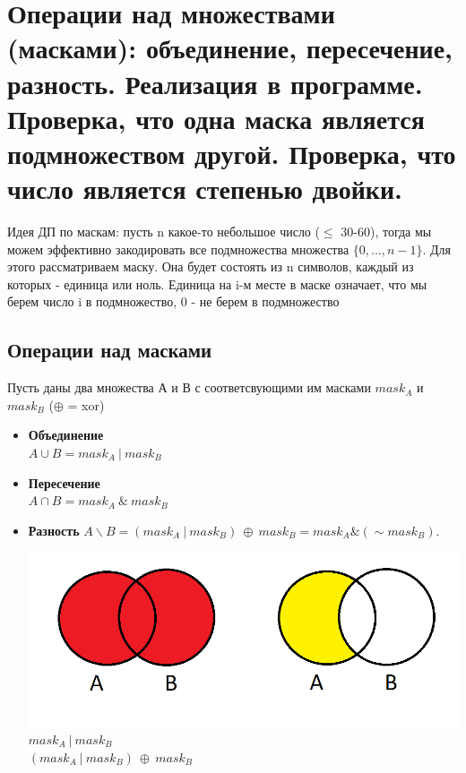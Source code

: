 \setcounter{section}{17}
\section{Операции над множествами (масками): объединение, пересечение, разность. Реализация в программе. Проверка, что одна маска является подмножеством другой. Проверка, что число является
степенью двойки.}
Идея ДП по маскам: пусть n какое-то небольшое число ($\leq$ 30-60), тогда мы можем эффективно закодировать все подмножества множества $\{0,...,n-1\}$. Для этого рассматриваем маску. Она будет состоять из n символов, каждый из которых - единица или ноль. Единица на i-м месте в маске означает, что мы берем число i в подмножество, 0 - не берем в подмножество
\subsection*{Операции над масками}
Пусть даны два множества А и В с соответсвующими им масками $mask_A$ и $mask_B$ ($\oplus$ = xor)
\begin{itemize}
    \item []\textbf{Объединение}\\  $A \cup B = mask_A \ | \ mask_B$
     \item []\textbf{Пересечение} \\ $A \cap B = mask_A \ \& \ mask_B$
     \item []\textbf{Разность} $A \backslash B = (mask_A \ | \ mask_B) \ \oplus \ mask_B = mask_A \&(\sim mask_B)$.  \begin{center}
         \includegraphics[width = 17cm]{images/18-24_alg1.PNG}
          $mask_A \ | \ mask_B$ \ \ \ \ \ \ \ \  \ \ \ \ \ \ \ \ \ \ \ \ \ \ \ \ \ \ \ \ \ \ $(mask_A \ | \ mask_B) \ \oplus \ mask_B$ \ \ 
     \end{center} 
\end{itemize}

